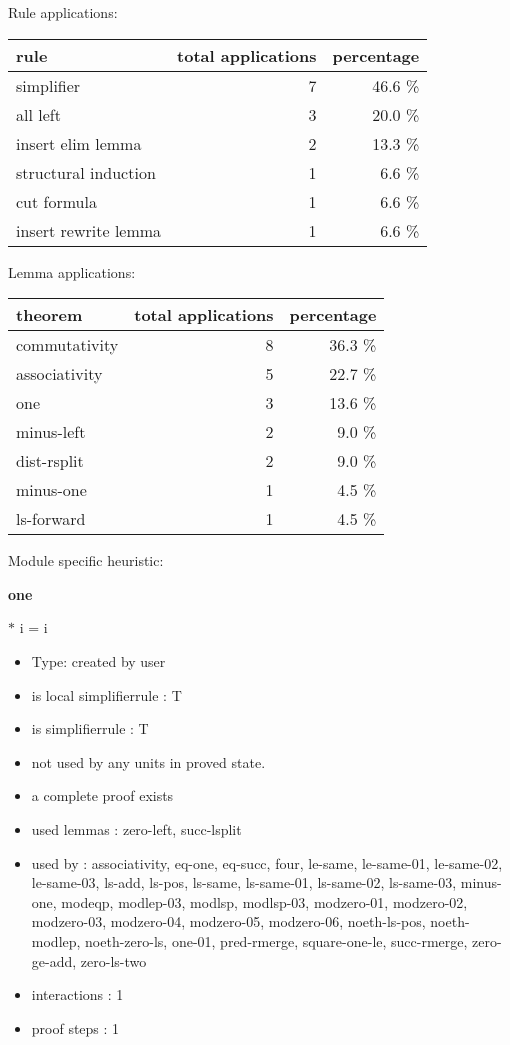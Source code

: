 \documentclass[a4paper]{article}
\begin{document}
Rule applications:

\begin{supertabular}{l|r|r}
rule	        & total applications & percentage \\ \hline
simplifier & 7 & 46.6 \% \\
all left & 3 & 20.0 \% \\
insert elim lemma & 2 & 13.3 \% \\
structural induction & 1 & 6.6 \% \\
cut formula & 1 & 6.6 \% \\
insert rewrite lemma & 1 & 6.6 \% \\

\end{supertabular}

Lemma applications:

\begin{supertabular}{l|r|r}
theorem	        & total applications & percentage \\ \hline
commutativity & 8 & 36.3 \% \\
associativity & 5 & 22.7 \% \\
one & 3 & 13.6 \% \\
minus-left & 2 & 9.0 \% \\
dist-rsplit & 2 & 9.0 \% \\
minus-one & 1 & 4.5 \% \\
ls-forward & 1 & 4.5 \% \\

\end{supertabular}

Module specific heuristic:

\pagebreak

{\LARGE\bf one}\label{lemma-one}

\medskip

  $*$ i = i

\begin{itemize}

\item Type: created by user

\item is local simplifierrule : T
\item is simplifierrule : T
\item not used by any units in proved state.
\item       a complete proof exists
\item       used lemmas  : zero-left, succ-lsplit
\item       used by      : associativity, eq-one, eq-succ, four, le-same, le-same-01, le-same-02, le-same-03, ls-add, ls-pos, ls-same, ls-same-01, ls-same-02, ls-same-03, minus-one, modeqp, modlep-03, modlsp, modlsp-03, modzero-01, modzero-02, modzero-03, modzero-04, modzero-05, modzero-06, noeth-ls-pos, noeth-modlep, noeth-zero-ls, one-01, pred-rmerge, square-one-le, succ-rmerge, zero-ge-add, zero-ls-two
\item       interactions : 1
\item       proof steps  : 1
\end{itemize}
\end{document}
